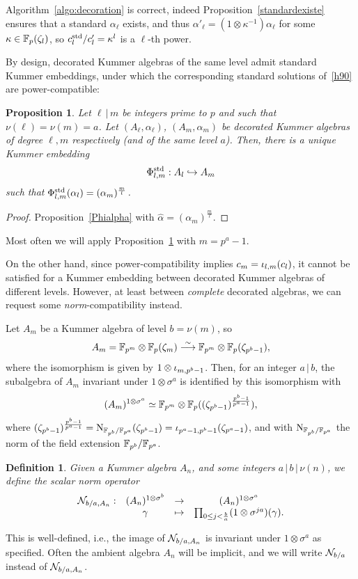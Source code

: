 \documentclass[sigconf]{acmart}
\newtheorem{proposition}[theorem]{Proposition}
\newtheorem{definition}[theorem]{Definition}
\begin{document}
Algorithm~\ref{algo:decoration} is correct, indeed Proposition~\ref{standardexiste} ensures that
a standard $\alpha_{\ell}$ exists, and thus $\alpha'_\ell=(1\otimes\kappa^{-1})\alpha_{\ell}$
for some $\kappa\in\mathbb{F}_{p}(\zeta_l)$, so $c^{\mathrm{std}}_l/c'_l=\kappa^l$ is a $\ell$-th power.


By design, decorated Kummer algebras of the same level admit standard Kummer embeddings,
under which the corresponding standard solutions of~\eqref{h90} are power-compatible:
\begin{proposition}
\label{embedincomplete}
Let $\ell\,|\,m$ be integers prime to $p$ and such that $\nu(\ell)=\nu(m)=a$.
Let $(A_\ell,\alpha_\ell)$, $(A_m,\alpha_m)$ be decorated Kummer algebras
of degree $\ell,m$ respectively (and of the same level $a$).
Then, there is a unique Kummer embedding
\[ {\Phi^{\mathrm{std}}_{{l},{m}}}:A_l\hookrightarrow A_m \]
such that ${\Phi^{\mathrm{std}}_{{l},{m}}}(\alpha_l)=(\alpha_m)^{\frac{m}{l}}$.
\end{proposition}
\begin{proof}
Proposition~\ref{Phialpha} with $\hat{\alpha}=(\alpha_m)^{\frac{m}{\ell}}$.
\end{proof}
Most often we will apply Proposition~\ref{embedincomplete} with $m=p^a-1$.

On the other hand, 
since power-compatibility implies $c_m={\iota_{{l},{m}}}(c_l)$,
it cannot be satisfied for a Kummer embedding
between decorated Kummer algebras of different levels.
However, at least between \emph{complete} decorated algebras, we can request some \emph{norm}-compatibility
instead.

Let $A_m$ be a Kummer algebra of level $b=\nu(m)$, so
\[ A_m=\mathbb{F}_{p^m}\otimes\mathbb{F}_{p}(\zeta_m)\overset{\sim}{\longrightarrow}\mathbb{F}_{p^m}\otimes\mathbb{F}_{p}(\zeta_{p^b-1}), \]
where the isomorphism is given by $1\otimes{\iota_{{m},{p^b-1}}}$.
Then, for an integer $a\,|\,b$,
the subalgebra of $A_m$ invariant under $1\otimes\sigma^a$ is identified
by this isomorphism with
\[ (A_m)^{1\otimes\sigma^a}\simeq\mathbb{F}_{p^m}\otimes\mathbb{F}_{p}((\zeta_{p^b-1})^{\frac{p^b-1}{p^a-1}}), \]
where
$(\zeta_{p^b-1})^{\frac{p^b-1}{p^a-1}}=\operatorname{N}_{\mathbb{F}_{p^b}/\mathbb{F}_{p^a}}(\zeta_{p^b-1})={\iota_{{p^a-1},{p^b-1}}}(\zeta_{p^a-1})$,
and with $\operatorname{N}_{\mathbb{F}_{p^b}/\mathbb{F}_{p^a}}$ the norm of the field extension
$\mathbb{F}_{p^b}/\mathbb{F}_{p^a}$.

\begin{definition}
\label{def:norm}
Given a Kummer algebra $A_n$, and some integers $a\,|\,b\,|\,\nu(n)$, we define
the \emph{scalar norm} operator
\[
\begin{array}{cccc}
  \mathcal{N}_{b/a,A_n}: & (A_n)^{1\otimes\sigma^b} & \to & (A_n)^{1\otimes\sigma^a} \\
  & \gamma & \mapsto & \prod_{0\leq j<\frac{b}{a}} (1 \otimes \sigma^{ja})(\gamma).
\end{array}
\]
\end{definition}
This is well-defined, i.e., the image of $\mathcal{N}_{b/a,A_n}$ is invariant under $1\otimes\sigma^a$ as specified.
Often the ambient algebra $A_n$ will be implicit,
and we will write $\mathcal{N}_{b/a}$ instead of $\mathcal{N}_{b/a,A_n}$.
\end{document}
